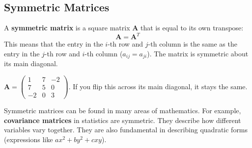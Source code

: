 \documentclass[11pt]{article}
\begin{document}
\subsection{Symmetric Matrices}
A \textbf{symmetric matrix} is a square matrix $\mathbf{A}$ that is equal to its own transpose:
\[ \mathbf{A} = \mathbf{A}^T \]
This means that the entry in the $i$-th row and $j$-th column is the same as the entry in the $j$-th row and $i$-th column ($a_{ij} = a_{ji}$). The matrix is symmetric about its main diagonal.
\begin{example}
    $\mathbf{A} = \begin{pmatrix} 1 & 7 & -2 \\ 7 & 5 & 0 \\ -2 & 0 & 3 \end{pmatrix}$. If you flip this across its main diagonal, it stays the same.
\end{example}

Symmetric matrices can be found in many areas of mathematics. For example, \textbf{covariance matrices} in statistics are symmetric. They describe how different variables vary together.
They are also fundamental in describing quadratic forms (expressions like $ax^2 + by^2 + cxy$).









\end{document}
